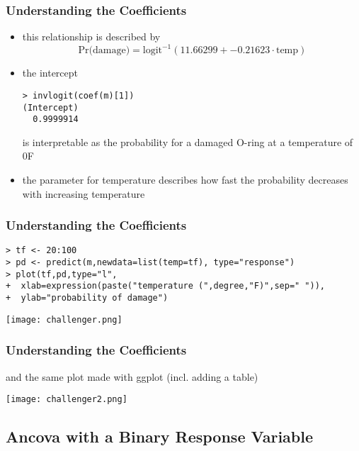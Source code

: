 \begin{frame}[fragile]\frametitle{Understanding the Coefficients}
\begin{itemize}
\item this relationship is described by $$\mbox{Pr(damage)}=\mbox{logit}^{-1}(11.66299 + -0.21623 \cdot \mbox{temp}) $$
\item the intercept
\begin{verbatim}
> invlogit(coef(m)[1])
(Intercept) 
  0.9999914 
\end{verbatim}
is interpretable as the probability for a damaged O-ring at a temperature of 0\degree F
\item the parameter for temperature describes how fast the probability decreases with increasing temperature
\end{itemize}
\end{frame}

\begin{frame}[fragile]\frametitle{Understanding the Coefficients}\footnotesize
\begin{verbatim}
> tf <- 20:100
> pd <- predict(m,newdata=list(temp=tf), type="response")
> plot(tf,pd,type="l",
+  xlab=expression(paste("temperature (",degree,"F)",sep=" ")),
+  ylab="probability of damage")
\end{verbatim}
\begin{center}
\texttt{[image: challenger.png]}
\end{center}
\end{frame}

\begin{frame}[fragile]\frametitle{Understanding the Coefficients}
and the same plot made with ggplot (incl. adding a table)
\begin{center}
\texttt{[image: challenger2.png]}
\end{center}
\end{frame}

\subsection[Binomial Ancova]{Ancova with a Binary Response Variable }

